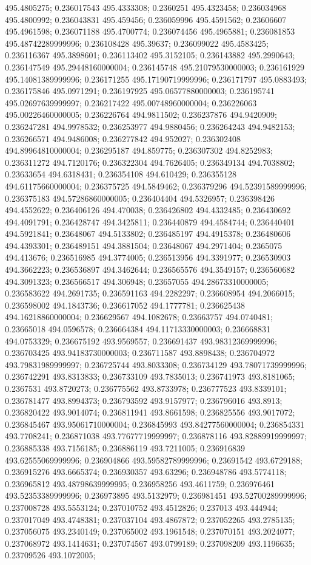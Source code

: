 495.4805275; 0.236017543 495.4333308; 0.2360251 495.4323458; 0.236034968 495.4800992; 0.236043831 495.459456; 0.236059996 495.4591562; 0.23606607 495.4961598; 0.236071188 495.4700774; 0.236074456 495.4965881; 0.236081853 495.48742289999996; 0.236108428 495.39637; 0.236099022 495.4583425; 0.236116367 495.3898601; 0.236113402 495.3152105; 0.236143882 495.2990643; 0.236147549 495.29448160000004; 0.236145748 495.21079530000003; 0.236161929 495.14081389999996; 0.236171255 495.17190719999996; 0.236171797 495.0883493; 0.236175846 495.0971291; 0.236197925 495.06577880000003; 0.236195741 495.02697639999997; 0.236217422 495.00748960000004; 0.236226063 495.00226460000005; 0.236226764 494.9811502; 0.236237876 494.9420909; 0.236247281 494.9978532; 0.236253977 494.9880456; 0.236264243 494.9482153; 0.236266571 494.9486008; 0.236277842 494.952027; 0.236302408 494.89964810000004; 0.236295187 494.859775; 0.236307302 494.8252983; 0.236311272 494.7120176; 0.236322304 494.7626405; 0.236349134 494.7038802; 0.23633654 494.6318431; 0.236354108 494.610429; 0.236355128 494.61175660000004; 0.236375725 494.5849462; 0.236379296 494.52391589999996; 0.236375183 494.57286860000005; 0.236404404 494.5326957; 0.236398426 494.4552622; 0.236406126 494.470038; 0.236426802 494.4332485; 0.236430692 494.4091791; 0.236428747 494.3425811; 0.236440879 494.4584744; 0.236440401 494.5921841; 0.23648067 494.5133802; 0.236485197 494.4915378; 0.236480606 494.4393301; 0.236489151 494.3881504; 0.23648067 494.2971404; 0.2365075 494.413676; 0.236516985 494.3774005; 0.236513956 494.3391977; 0.236530903 494.3662223; 0.236536897 494.3462644; 0.236565576 494.3549157; 0.236560682 494.3091323; 0.236566517 494.306948; 0.23657055 494.28673310000005; 0.236583622 494.2691735; 0.236591163 494.2282297; 0.236608954 494.2066015; 0.236598002 494.1843736; 0.236617052 494.1777781; 0.236625438 494.16218860000004; 0.236629567 494.1082678; 0.23663757 494.0740481; 0.23665018 494.0596578; 0.236664384 494.11713330000003; 0.236668831 494.0753329; 0.236675192 493.9569557; 0.236691437 493.98312369999996; 0.236703425 493.94183730000003; 0.236711587 493.8898438; 0.236704972 493.79831989999997; 0.236725744 493.8033308; 0.236734129 493.78071739999996; 0.236742291 493.8313833; 0.236733109 493.7835013; 0.236741973 493.8181065; 0.2367531 493.8720273; 0.236775562 493.8733978; 0.236777523 493.8339101; 0.236781477 493.8994373; 0.236793592 493.9157977; 0.236796016 493.8913; 0.236820422 493.9014074; 0.236811941 493.8661598; 0.236825556 493.9017072; 0.236845467 493.95061710000004; 0.236845993 493.84277560000004; 0.236854331 493.7708241; 0.236871038 493.77677719999997; 0.236878116 493.82889919999997; 0.236885338 493.7156185; 0.236886119 493.7211005; 0.236916839 493.62555069999996; 0.236904866 493.59582789999996; 0.23691542 493.6729188; 0.236915276 493.6665374; 0.236930357 493.63296; 0.236948786 493.5774118; 0.236965812 493.48798639999995; 0.236958256 493.4611759; 0.236976461 493.52353389999996; 0.236973895 493.5132979; 0.236981451 493.52700289999996; 0.237008728 493.5553124; 0.237010752 493.4512826; 0.237013 493.444944; 0.237017049 493.4748381; 0.237037104 493.4867872; 0.237052265 493.2785135; 0.237056075 493.2340149; 0.237065002 493.1961548; 0.237070151 493.2024077; 0.237068972 493.1414631; 0.237074567 493.0799189; 0.237098209 493.1196635; 0.23709526 493.1072005; 
